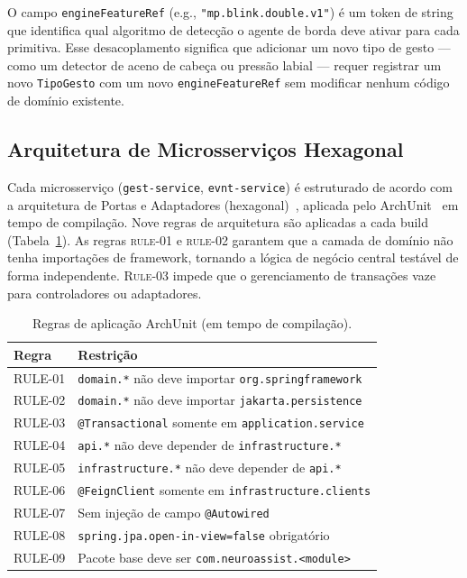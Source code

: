 O campo \texttt{engineFeatureRef} (e.g., \texttt{"mp.blink.double.v1"}) é um token de
string que identifica qual algoritmo de detecção o agente de borda deve ativar para cada
primitiva. Esse desacoplamento significa que adicionar um novo tipo de gesto — como um
detector de aceno de cabeça ou pressão labial — requer registrar um novo
\texttt{TipoGesto} com um novo \texttt{engineFeatureRef} sem modificar nenhum código
de domínio existente.

\subsection{Arquitetura de Microsserviços Hexagonal}
\label{sec:hexagonal}

Cada microsserviço (\texttt{gest-service}, \texttt{evnt-service}) é estruturado de
acordo com a arquitetura de Portas e Adaptadores (hexagonal)~\cite{cockburn2005hexagonal},
aplicada pelo ArchUnit~\cite{archunit} em tempo de compilação. Nove regras de
arquitetura são aplicadas a cada build (Tabela~\ref{tab:archunit}). As regras
\textsc{rule-01} e \textsc{rule-02} garantem que a camada de domínio não tenha
importações de framework, tornando a lógica de negócio central testável de forma
independente. \textsc{Rule-03} impede que o gerenciamento de transações vaze para
controladores ou adaptadores.

\begin{table}[htbp]
\centering
\caption{Regras de aplicação ArchUnit (em tempo de compilação).}
\label{tab:archunit}
\begin{tabular}{ll}
\toprule
Regra & Restrição \\
\midrule
RULE-01 & \texttt{domain.*} não deve importar \texttt{org.springframework} \\
RULE-02 & \texttt{domain.*} não deve importar \texttt{jakarta.persistence} \\
RULE-03 & \texttt{@Transactional} somente em \texttt{application.service} \\
RULE-04 & \texttt{api.*} não deve depender de \texttt{infrastructure.*} \\
RULE-05 & \texttt{infrastructure.*} não deve depender de \texttt{api.*} \\
RULE-06 & \texttt{@FeignClient} somente em \texttt{infrastructure.clients} \\
RULE-07 & Sem injeção de campo \texttt{@Autowired} \\
RULE-08 & \texttt{spring.jpa.open-in-view=false} obrigatório \\
RULE-09 & Pacote base deve ser \texttt{com.neuroassist.<module>} \\
\bottomrule
\end{tabular}
\end{table}


